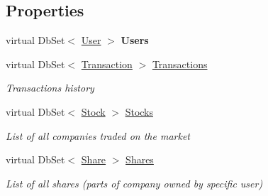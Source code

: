 \subsection*{Properties}
\begin{DoxyCompactItemize}
\item 
\mbox{\label{class_gielda_l2_1_1_d_b_1_1_gielda_l2_context_a938f8b59f6bf592a6d283649ab938186}} 
virtual Db\+Set$<$ \mbox{\hyperlink{class_gielda_l2_1_1_d_b_1_1_entities_1_1_user}{User}} $>$ {\bfseries Users}
\item 
virtual Db\+Set$<$ \mbox{\hyperlink{class_gielda_l2_1_1_d_b_1_1_entities_1_1_transaction}{Transaction}} $>$ \mbox{\hyperlink{class_gielda_l2_1_1_d_b_1_1_gielda_l2_context_a809df5e666f7fdb0cc6e53adad91efe8}{Transactions}}
\begin{DoxyCompactList}\small\item\em Transactions history \end{DoxyCompactList}\item 
virtual Db\+Set$<$ \mbox{\hyperlink{class_gielda_l2_1_1_d_b_1_1_entities_1_1_stock}{Stock}} $>$ \mbox{\hyperlink{class_gielda_l2_1_1_d_b_1_1_gielda_l2_context_aea04642796c9518519cce75620c7cb9d}{Stocks}}
\begin{DoxyCompactList}\small\item\em List of all companies traded on the market \end{DoxyCompactList}\item 
virtual Db\+Set$<$ \mbox{\hyperlink{class_gielda_l2_1_1_d_b_1_1_entities_1_1_share}{Share}} $>$ \mbox{\hyperlink{class_gielda_l2_1_1_d_b_1_1_gielda_l2_context_a10444d33001e7c0ae678b54d477a0b60}{Shares}}
\begin{DoxyCompactList}\small\item\em List of all shares (parts of company owned by specific user) \end{DoxyCompactList}\item 
\mbox{\label{class_gielda_l2_1_1_d_b_1_1_gielda_l2_context_a0e1ad1d252c6ffee744dd40aa570bd45}} 

\end{DoxyCompactItemize}
